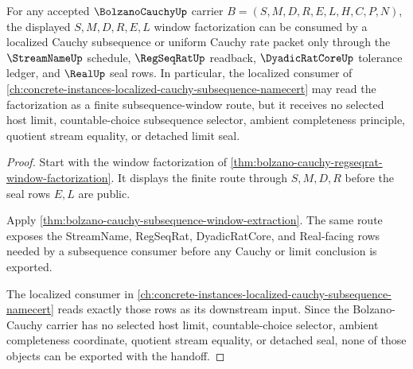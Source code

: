 \begin{theorem}
\label{thm:bolzano-cauchy-uniform-subsequence-modulus}
For any accepted $\BolzanoCauchyUp$ carrier $B=(S,M,D,R,E,L,H,C,P,N)$, the displayed $S,M,D,R,E,L$ window factorization can be consumed by a localized Cauchy subsequence or uniform Cauchy rate packet only through the $\StreamNameUp$ schedule, $\RegSeqRatUp$ readback, $\DyadicRatCoreUp$ tolerance ledger, and $\RealUp$ seal rows. In particular, the localized consumer of \autoref{ch:concrete-instances-localized-cauchy-subsequence-namecert} may read the factorization as a finite subsequence-window route, but it receives no selected host limit, countable-choice subsequence selector, ambient completeness principle, quotient stream equality, or detached limit seal.
\end{theorem}
\begin{proof}
Start with the window factorization of \autoref{thm:bolzano-cauchy-regseqrat-window-factorization}. It displays the finite route through $S,M,D,R$ before the seal rows $E,L$ are public.

Apply \autoref{thm:bolzano-cauchy-subsequence-window-extraction}. The same route exposes the StreamName, RegSeqRat, DyadicRatCore, and Real-facing rows needed by a subsequence consumer before any Cauchy or limit conclusion is exported.

The localized consumer in \autoref{ch:concrete-instances-localized-cauchy-subsequence-namecert} reads exactly those rows as its downstream input. Since the Bolzano-Cauchy carrier has no selected host limit, countable-choice selector, ambient completeness coordinate, quotient stream equality, or detached seal, none of those objects can be exported with the handoff.
\end{proof}

